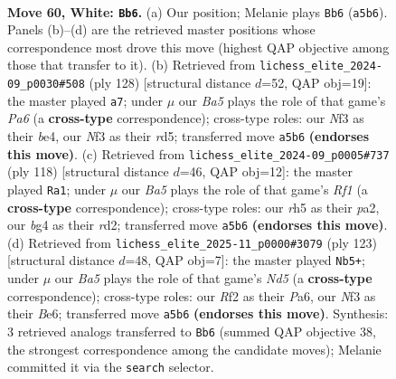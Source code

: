 \documentclass[11pt]{article}
\begin{document}
\clearpage

\begin{figure}[p]\centering
\begin{subfigure}{0.46\textwidth}\centering
\resizebox{\linewidth}{!}{%
\newchessgame
\chessboard[
  setfen={8/1B1k4/8/B6r/PK4bp/1P3N2/5R2/8 w - - 1 60},
  showmover=false,
  pgfstyle=straightmove, color=movearrow, markmove={a5-b6}
]}
\caption{}
\end{subfigure}\hfill
\begin{subfigure}{0.46\textwidth}\centering
\resizebox{\linewidth}{!}{%
\newchessgame
\chessboard[
  setfen={8/7p/PK5P/3rR1B1/4b3/2P2k2/8/8 w - - 1 65},
  showmover=false,
  pgfstyle=straightmove, color=movearrow, markmove={a6-a7}
]}
\caption{}
\end{subfigure}
\\[4pt]
\begin{subfigure}{0.46\textwidth}\centering
\resizebox{\linewidth}{!}{%
\newchessgame
\chessboard[
  setfen={8/5k2/8/2P5/1b1B1P2/6P1/p2r4/5RK1 w - - 1 60},
  showmover=false,
  pgfstyle=straightmove, color=movearrow, markmove={f1-a1}
]}
\caption{}
\end{subfigure}\hfill
\begin{subfigure}{0.46\textwidth}\centering
\resizebox{\linewidth}{!}{%
\newchessgame
\chessboard[
  setfen={8/8/p3b2R/P1pk4/3n4/2K5/3B4/8 b - - 2 62},
  showmover=false,
  pgfstyle=straightmove, color=movearrow, markmove={d4-b5}
]}
\caption{}
\end{subfigure}
\caption{\textbf{Move 60, White: \texttt{Bb6}.} (a) Our position; Melanie plays \texttt{Bb6} (\texttt{a5b6}). Panels (b)--(d) are the retrieved master positions whose correspondence most drove this move (highest QAP objective among those that transfer to it). (b) Retrieved from \texttt{lichess\_elite\_2024-09\_p0030\#508} (ply 128) [structural distance $d$=52, QAP obj=19]: the master played \texttt{a7}; under $\mu$ our \emph{Ba5} plays the role of that game's \emph{Pa6} (a \textbf{cross-type} correspondence); cross-type roles: our \emph{N}f3 as their \emph{b}e4, our \emph{N}f3 as their \emph{r}d5; transferred move \texttt{a5b6} \textbf{(endorses this move)}. (c) Retrieved from \texttt{lichess\_elite\_2024-09\_p0005\#737} (ply 118) [structural distance $d$=46, QAP obj=12]: the master played \texttt{Ra1}; under $\mu$ our \emph{Ba5} plays the role of that game's \emph{Rf1} (a \textbf{cross-type} correspondence); cross-type roles: our \emph{r}h5 as their \emph{p}a2, our \emph{b}g4 as their \emph{r}d2; transferred move \texttt{a5b6} \textbf{(endorses this move)}. (d) Retrieved from \texttt{lichess\_elite\_2025-11\_p0000\#3079} (ply 123) [structural distance $d$=48, QAP obj=7]: the master played \texttt{Nb5+}; under $\mu$ our \emph{Ba5} plays the role of that game's \emph{Nd5} (a \textbf{cross-type} correspondence); cross-type roles: our \emph{R}f2 as their \emph{P}a6, our \emph{N}f3 as their \emph{B}e6; transferred move \texttt{a5b6} \textbf{(endorses this move)}. Synthesis: 3 retrieved analogs transferred to \texttt{Bb6} (summed QAP objective 38, the strongest correspondence among the candidate moves); Melanie committed it via the \texttt{search} selector.}
\label{fig:thought-m118}
\end{figure}
\end{document}

